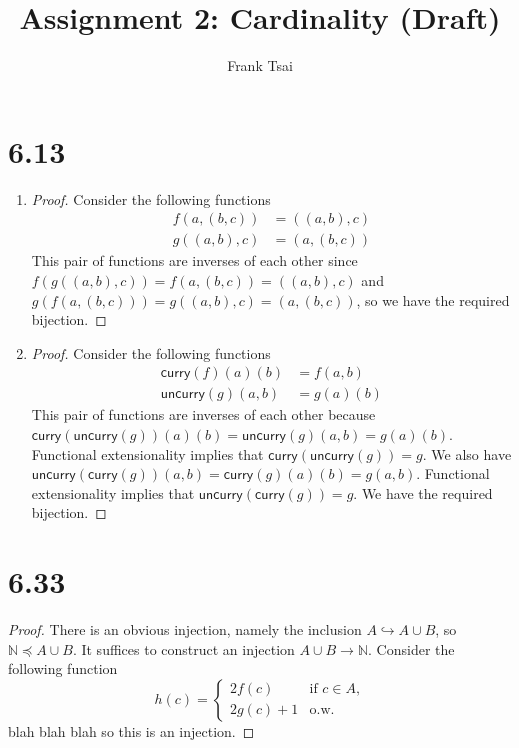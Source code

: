 \documentclass[a4paper]{article}
\title{Assignment 2: Cardinality (Draft)}
\author{Frank Tsai}
\newcommand{\curry}{\mathsf{curry}}
\newcommand{\uncurry}{\mathsf{uncurry}}
\newcommand{\N}{\mathbb{N}}
\begin{document}
\maketitle

\section*{6.13}
\begin{enumerate}
\item
  \begin{proof}
    Consider the following functions
    \begin{align*}
      f(a,(b,c)) &= ((a,b),c)\\
      g((a,b),c) &= (a,(b,c))
    \end{align*}
    This pair of functions are inverses of each other since $f(g((a,b),c)) = f(a,(b,c)) = ((a,b),c)$ and $g(f(a,(b,c))) = g((a,b),c) = (a,(b,c))$, so we have the required bijection.
  \end{proof}
\item
  \begin{proof}
    Consider the following functions
    \begin{align*}
      \curry(f)(a)(b) &= f(a,b)\\
      \uncurry(g)(a,b) &= g(a)(b)
    \end{align*}
    This pair of functions are inverses of each other because $\curry(\uncurry(g))(a)(b) = \uncurry(g)(a,b) = g(a)(b)$.
    Functional extensionality implies that $\curry(\uncurry(g)) = g$.
    We also have $\uncurry(\curry(g))(a,b) = \curry(g)(a)(b) = g(a,b)$.
    Functional extensionality implies that $\uncurry(\curry(g)) = g$.
    We have the required bijection.
  \end{proof}
\end{enumerate}

\section*{6.33}
\begin{proof}
  There is an obvious injection, namely the inclusion $A \hookrightarrow A \cup B$, so $\N \preceq A \cup B$.
  It suffices to construct an injection $A \cup B \to \N$.
  Consider the following function
  \[h(c) =
    \begin{cases}
      2f(c) & \text{if $c \in A$,}\\
      2g(c) + 1 & \text{o.w.}
    \end{cases}
  \]
  blah blah blah so this is an injection.
\end{proof}
\end{document}
